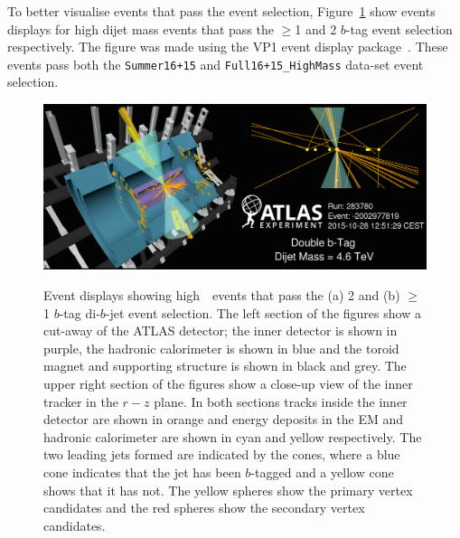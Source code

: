 To better visualise events that pass the event selection,
Figure~\ref{fig:evt-vp1} show events displays for high dijet mass events that pass
the $\geq$1 and 2 $b$-tag event selection respectively.
The figure was made using the VP1 event display package~\cite{evt-vp1}.
These events pass both the \verb|Summer16+15| and \verb|Full16+15_HighMass| data-set event selection.

\begin{figure}[!ht]
  \begin{center}
    \captionsetup[subfigure]{aboveskip=0pt,justification=centering}
          {\includegraphics[width=0.95\linewidth, angle=0]{figs/Dibjet/Gen/evt-vp1_bb.png}}\\
  \end{center}
  \caption
      {Event displays showing high~\mjj~events that pass the (a) 2 and (b) $\geq$1 $b$-tag di-$b$-jet event selection.
        The left section of the figures show a cut-away of the ATLAS detector;
        the inner detector is shown in purple, the hadronic calorimeter is shown in blue
        and the toroid magnet and supporting structure is shown in black and grey.
        The upper right section of the figures show a close-up view of the inner tracker in the $r-z$ plane.
        In both sections tracks inside the inner detector are shown in orange
        and energy deposits in the EM and hadronic calorimeter are shown in cyan and yellow respectively.
        The two leading jets formed are indicated by the cones, where a blue cone indicates that the jet has been
        $b$-tagged and a yellow cone shows that it has not.
        The yellow spheres show the primary vertex candidates and the red spheres show the secondary vertex candidates.
      }
  \label{fig:evt-vp1}
\end{figure}

